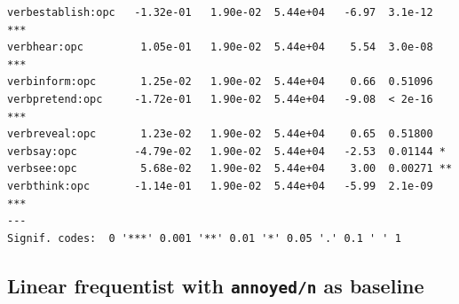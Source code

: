 \documentclass[10pt]{article}\usepackage[]{graphicx}\usepackage[dvipsnames]{xcolor}
\makeatletter
\newenvironment{kframe}{%
 \def\at@end@of@kframe{}%
 \ifinner\ifhmode%
  \def\at@end@of@kframe{\end{minipage}}%
  \begin{minipage}{\columnwidth}%
 \fi\fi%
 \def\FrameCommand##1{\hskip\@totalleftmargin \hskip-\fboxsep
 \colorbox{shadecolor}{##1}\hskip-\fboxsep
     \hskip-\linewidth \hskip-\@totalleftmargin \hskip\columnwidth}%
 \MakeFramed {\advance\hsize-\width
   \@totalleftmargin\z@ \linewidth\hsize
   \@setminipage}}%
 {\par\unskip\endMakeFramed%
 \at@end@of@kframe}
\newenvironment{knitrout}{}{} %
\makeatother
\begin{document}
\begin{knitrout}
\begin{kframe}
\begin{verbatim}
verbestablish:opc   -1.32e-01   1.90e-02  5.44e+04   -6.97  3.1e-12 ***
verbhear:opc         1.05e-01   1.90e-02  5.44e+04    5.54  3.0e-08 ***
verbinform:opc       1.25e-02   1.90e-02  5.44e+04    0.66  0.51096    
verbpretend:opc     -1.72e-01   1.90e-02  5.44e+04   -9.08  < 2e-16 ***
verbreveal:opc       1.23e-02   1.90e-02  5.44e+04    0.65  0.51800    
verbsay:opc         -4.79e-02   1.90e-02  5.44e+04   -2.53  0.01144 *  
verbsee:opc          5.68e-02   1.90e-02  5.44e+04    3.00  0.00271 ** 
verbthink:opc       -1.14e-01   1.90e-02  5.44e+04   -5.99  2.1e-09 ***
---
Signif. codes:  0 '***' 0.001 '**' 0.01 '*' 0.05 '.' 0.1 ' ' 1
\end{verbatim}
\end{kframe}
\end{knitrout}

\subsection{Linear frequentist with \texttt{annoyed/n} as baseline}
\end{document}
